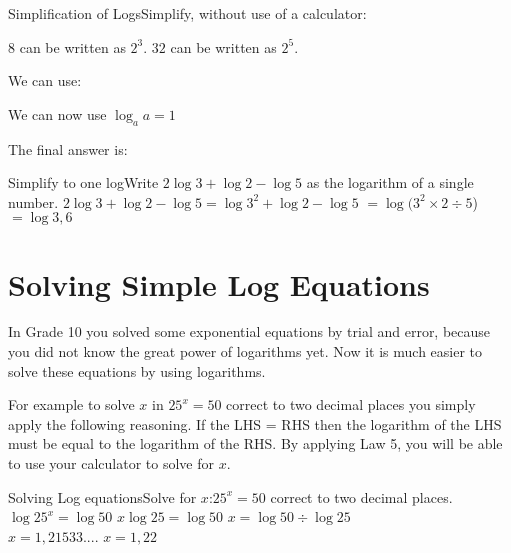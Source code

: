 \begin{wex}{Simplification of Logs}{Simplify, without use of a calculator:
}
{
$8$ can be written as $2^3$. $32$ can be written as $2^5$.


We can use:


We can now use $\log_a a =1$


The final answer is:
}
\end{wex}



\begin{wex}{Simplify to one log}{Write $2\log {3} + \log {2} -\log {5}$ as the logarithm of a single number.}{
$2\log {3} + \log {2} -\log {5} = \log {3^2} + \log {2} -\log {5}$
$= \log ({3}^2\times 2 \div 5$)
$= \log {3,6}$
}
\end{wex}


\section{Solving Simple Log Equations}

In Grade 10 you solved some exponential equations by trial and error, because you did not know the great power of logarithms yet.  Now it is much easier to solve these equations by using logarithms.

For example to solve $x$ in $25^x = 50$ correct to two decimal places you simply apply the following reasoning.  If the LHS = RHS then the logarithm of the LHS must be equal to the logarithm of the RHS.  By applying Law 5, you will be able to use your calculator to solve for $x$.

\begin{wex}{Solving Log equations}{Solve for $x$:\quad $25^x = 50$ correct to two decimal places.}{
$\log{25^x} = \log{50}$
$x \log{25} = \log{50}$
$x = \log{50} \div \log{25}$\\
$x = 1,21533....$
$x=1,22$
}
\end{wex}

